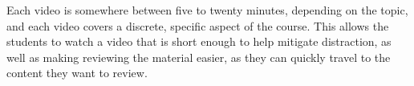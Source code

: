 \documentclass[10pt]{article}
\begin{document}
Each video is somewhere between five to twenty minutes, depending on the topic, and each video covers a discrete, specific aspect of the course.
This allows the students to watch a video that is short enough to help mitigate distraction, as well as making reviewing the material easier, as they can quickly travel to the content they want to review.

%


%
\end{document}
